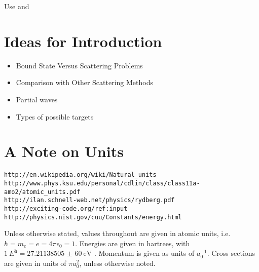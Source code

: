 \documentclass[Introduction.tex]{subfiles}
\begin{document}
Use \cite{Heyrovska2011} and \cite{Saito2000}





\section{Ideas for Introduction}

\begin{itemize}
	\item Bound State Versus Scattering Problems
	\item Comparison with Other Scattering Methods
	\item Partial waves
	\item Types of possible targets
\end{itemize}



\section{A Note on Units}
\label{sec:Units}

\begin{verbatim}
http://en.wikipedia.org/wiki/Natural_units
http://www.phys.ksu.edu/personal/cdlin/class/class11a-amo2/atomic_units.pdf
http://ilan.schnell-web.net/physics/rydberg.pdf
http://exciting-code.org/ref:input
http://physics.nist.gov/cuu/Constants/energy.html
\end{verbatim}


Unless otherwise stated, values throughout are given in atomic units, i.e. $\hbar = m_e = e = 4\pi\epsilon_0 = 1$. Energies are given in hartrees, with $\SI{1}{\hartree} = \SI{27.211 385 05(60)}{\electronvolt}$ \cite{Mohr2012,NISTConversions}. Momentum is given as units of $a_0^{-1}$. Cross sections are given in units of $\pi a_0^2$, unless otherwise noted.
\end{document}
